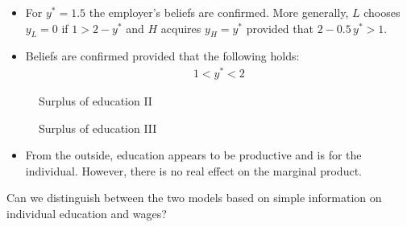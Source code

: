 \begin{frame}
\begin{itemize}\setlength\itemsep{1em}
\item For $y^* = 1.5$ the employer's beliefs are confirmed. More generally, $L$ chooses $y_L = 0$ if $1 > 2 - y^*$ and $H$ acquires $y_H = y^*$ provided that $2 - 0.5\,y^* > 1$.
\item Beliefs are confirmed provided that the following holds:
	\begin{align*}
	1 < y^* < 2
	\end{align*}
\end{itemize}
\end{frame}
\begin{frame}\begin{figure}[htp]\centering
\caption{Surplus of education II}
\end{figure}\end{frame}
\begin{frame}\begin{figure}[htp]\centering
\caption{Surplus of education III}
\end{figure}\end{frame}
\begin{frame}
\begin{itemize}\setlength\itemsep{1em}
\item From the outside, education appears to be productive and is for the individual. However, there is no real effect on the marginal product.\\
\end{itemize}\vspace{0.5cm}

Can we distinguish between the two models based on simple information on individual education and wages?

\end{frame}
